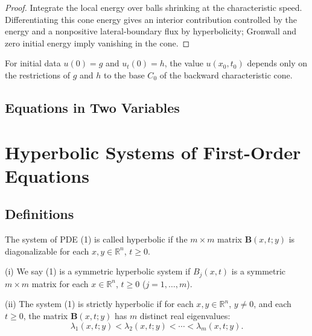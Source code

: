 \begin{proof}
\sketch Integrate the local energy over balls shrinking at the characteristic speed. Differentiating this cone energy gives an interior contribution controlled by the energy and a nonpositive lateral-boundary flux by hyperbolicity; Gronwall and zero initial energy imply vanishing in the cone.
\end{proof}

\begin{remark}
\label{rem:hyperbolic-finite-propagation-remark}
For initial data $u(0)=g$ and $u_t(0)=h$, the value $u(x_0,t_0)$ depends only on the restrictions of $g$ and $h$ to the base $C_0$ of the backward characteristic cone.
\end{remark}

\subsection{Equations in Two Variables}

\section{Hyperbolic Systems of First-Order Equations}
\label{sec:hyperbolic-systems-first-order-equations}

\subsection{Definitions}

\begin{definition}
\label{def:hyperbolic-system}
The system of PDE (1) is called hyperbolic if the $m \times m$ matrix $\mathbf{B}(x, t; y)$ is diagonalizable for each $x, y \in \mathbb{R}^n$, $t \geq 0$.
\end{definition}

\begin{definition}
\label{def:symmetric-strictly-hyperbolic-system}
(i) We say (1) is a symmetric hyperbolic system if $B_j(x, t)$ is a symmetric $m \times m$ matrix for each $x \in \mathbb{R}^n$, $t \geq 0$ ($j = 1, \ldots, m$).

(ii) The system (1) is strictly hyperbolic if for each $x, y \in \mathbb{R}^n$, $y \neq 0$, and each $t \geq 0$, the matrix $\mathbf{B}(x, t; y)$ has $m$ distinct real eigenvalues:
\[
\lambda_1(x, t; y) < \lambda_2(x, t; y) < \cdots < \lambda_m(x, t; y).
\]
\end{definition}

